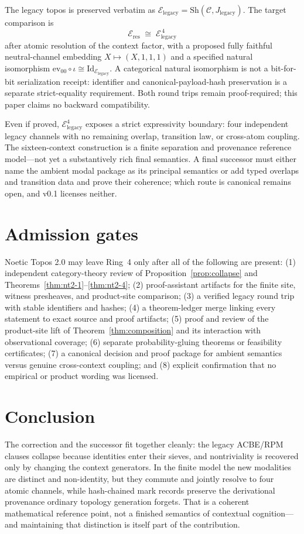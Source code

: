 \documentclass[11pt]{amsart}
\theoremstyle{definition}
\theoremstyle{remark}
\newcommand{\Sh}{\mathrm{Sh}}
\newcommand{\Jleg}{J_{\mathrm{legacy}}}
\newcommand{\Eres}{\mathcal{E}_{\mathrm{res}}}
\newcommand{\Eleg}{\mathcal{E}_{\mathrm{legacy}}}
\begin{document}
The legacy topos is preserved verbatim as $\Eleg=\Sh(\mathcal{C},\Jleg)$. The target comparison is
\[
\Eres \;\cong\; \Eleg^{\,4}
\]
after atomic resolution of the context factor, with a proposed fully faithful neutral-channel embedding $X \mapsto (X,1,1,1)$ and a specified natural isomorphism $\mathrm{ev}_{00}\circ\iota \cong \mathrm{Id}_{\Eleg}$. A categorical natural isomorphism is not a bit-for-bit serialization receipt: identifier and canonical-payload-hash preservation is a separate strict-equality requirement. Both round trips remain proof-required; this paper claims no backward compatibility.

Even if proved, $\Eleg^{4}$ exposes a strict expressivity boundary: four independent legacy channels with no remaining overlap, transition law, or cross-atom coupling. The sixteen-context construction is a finite separation and provenance reference model---not yet a substantively rich final semantics. A final successor must either name the ambient modal package as its principal semantics or add typed overlaps and transition data and prove their coherence; which route is canonical remains open, and v0.1 licenses neither.

\section{Admission gates}

Noetic Topos 2.0 may leave Ring~4 only after all of the following are present: (1) independent category-theory review of Proposition~\ref{prop:collapse} and Theorems~\ref{thm:nt2-1}--\ref{thm:nt2-4}; (2) proof-assistant artifacts for the finite site, witness presheaves, and product-site comparison; (3) a verified legacy round trip with stable identifiers and hashes; (4) a theorem-ledger merge linking every statement to exact source and proof artifacts; (5) proof and review of the product-site lift of Theorem~\ref{thm:composition} and its interaction with observational coverage; (6) separate probability-gluing theorems or feasibility certificates; (7) a canonical decision and proof package for ambient semantics versus genuine cross-context coupling; and (8) explicit confirmation that no empirical or product wording was licensed.

\section{Conclusion}

The correction and the successor fit together cleanly: the legacy ACBE/RPM clauses collapse because identities enter their sieves, and nontriviality is recovered only by changing the context generators. In the finite model the new modalities are distinct and non-identity, but they commute and jointly resolve to four atomic channels, while hash-chained mark records preserve the derivational provenance ordinary topology generation forgets. That is a coherent mathematical reference point, not a finished semantics of contextual cognition---and maintaining that distinction is itself part of the contribution.
\end{document}
